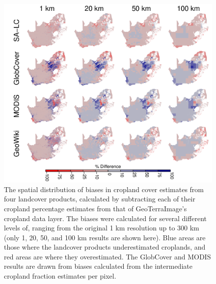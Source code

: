 \documentclass[11 pt]{article}
\begin{document}
\begin{figure}[H]
\includegraphics[width = \linewidth]{../figures/bias_map.pdf}
\caption{The spatial distribution of biases in cropland cover estimates from four landcover products, calculated by subtracting each of their cropland percentage estimates from that of GeoTerraImage's cropland data layer. The biases were calculated for several different levels of, ranging from the original 1 km resolution up to 300 km (only 1, 20, 50, and 100 km results are shown here). Blue areas are those where the landcover products underestimated croplands, and red areas are where they overestimated. The GlobCover and MODIS results are drawn from biases calculated from the intermediate cropland fraction estimates per pixel.}
\end{figure}
\end{document}
